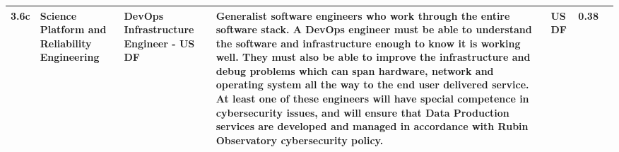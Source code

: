 \begin{longtable} {|l|p{}|p{}|p{}|l|l|l|}
{3.6c}&{Science Platform and Reliability Engineering}&{DevOps Infrastructure Engineer - US DF}&{Generalist software engineers who work through the entire software stack. A DevOps engineer must be able to understand the software and infrastructure enough to know it is working well. They must also be able to improve the infrastructure and debug problems which can span hardware, network and operating system all the way to the end user delivered service.  At least one of these engineers will have special competence in cybersecurity issues, and will ensure that Data Production services are developed and managed in accordance with Rubin Observatory cybersecurity policy.}&{US DF}&{0.38} \\ \hline
\end{longtable} \normalsize
